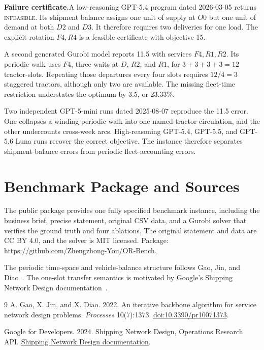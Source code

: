 \documentclass[10pt]{article}
\newcommand{\evidencebox}[1]{%
  \par\vspace{3pt}\noindent
  \colorbox{orlight}{%
    \parbox{\dimexpr\linewidth-2\fboxsep\relax}{\small\textbf{Failure certificate.}\hspace{0.35em}#1}%
  }\par\vspace{4pt}
}
\providecommand{\doi}[1]{\href{https://doi.org/#1}{doi:#1}}
\begin{document}
\evidencebox{A low-reasoning GPT-5.4 program dated 2026-03-05 returns \textsc{infeasible}. Its shipment balance assigns one unit of supply at $O0$ but one unit of demand at both $D2$ and $D3$. It therefore requires two deliveries for one load. The explicit rotation $F4,R4$ is a feasible certificate with objective 15.}

A second generated Gurobi model reports 11.5 with services $F4,R1,R2$. Its periodic walk uses $F4$, three waits at $D$, $R2$, and $R1$, for $3+3+3+3=12$ tractor-slots. Repeating those departures every four slots requires $12/4=3$ staggered tractors, although only two are available. The missing fleet-time restriction understates the optimum by 3.5, or 23.33\%.

Two independent GPT-5-mini runs dated 2025-08-07 reproduce the 11.5 error. One collapses a winding periodic walk into one named-tractor circulation, and the other undercounts cross-week arcs. High-reasoning GPT-5.4, GPT-5.5, and GPT-5.6 Luna runs recover the correct objective. The instance therefore separates shipment-balance errors from periodic fleet-accounting errors.

\section{Benchmark Package and Sources}

The public package provides one fully specified benchmark instance, including the business brief, precise statement, original CSV data, and a Gurobi solver that verifies the ground truth and four ablations. The original statement and data are CC BY 4.0, and the solver is MIT licensed. Package: \url{https://github.com/Zhengzhong-You/OR-Bench}.

The periodic time-space and vehicle-balance structure follows Gao, Jin, and Diao~\cite{gao2022}. The one-slot transfer semantics is motivated by Google's Shipping Network Design documentation~\cite{google2024}.

\begin{thebibliography}{9}\small
{}
A. Gao, X. Jin, and X. Diao. 2022.
An iterative backbone algorithm for service network design problems.
\emph{Processes} 10(7):1373. \doi{10.3390/pr10071373}.

Google for Developers. 2024.
Shipping Network Design, Operations Research API.
\href{https://developers.google.com/optimization/service/shipping/network_design}{Shipping Network Design documentation}.
\end{thebibliography}
\end{document}
